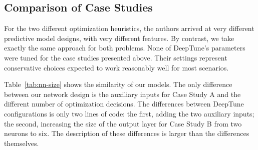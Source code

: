\subsection{Comparison of Case Studies}



For the two different optimization heuristics, the authors arrived at very different predictive model designs, with very different features. By contrast, we take exactly the same approach for both problems. None of DeepTune's parameters were tuned for the case studies presented above. Their settings represent conservative choices expected to work reasonably well for most scenarios.

Table~\ref{tab:nn-size} shows the similarity of our models. The only difference between our network design is the auxiliary inputs for Case Study A and the different number of optimization decisions. The differences between DeepTune configurations is only two lines of code: the first, adding the two auxiliary inputs; the second, increasing the size of the output layer for Case Study B from two neurons to six. The description of these differences is larger than the differences themselves.
